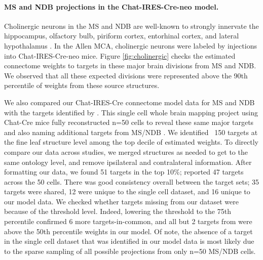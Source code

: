 \paragraph{MS and NDB projections in the Chat-IRES-Cre-neo model.}

Cholinergic neurons in the MS and NDB are well-known to strongly innervate the hippocampus, olfactory bulb, piriform cortex, entorhinal cortex, and lateral hypothalamus \citep{Zaborszky2015-fm, Watson2012TheMN}.
In the Allen MCA, cholinergic neurons were labeled by injections into Chat-IRES-Cre-neo mice.
Figure \ref{fig:cholinergic} checks the estimated connectome weights to targets in these major brain divisions from MS and NDB.
We observed that all these expected divisions were represented above the 90th percentile of weights from these source structures.

We also compared our Chat-IRES-Cre connectome model data for MS and NDB with the targets identified by  \citet{Li2018-nu}.
This single cell whole brain mapping project using Chat-Cre mice fully reconstructed n=50 cells to reveal these same major targets and also naming additional targets from MS/NDB \citep{Li2018-nu}.
We identified ~150 targets at the fine leaf structure level among the top decile of estimated weights.
To directly compare our data across studies, we merged structures as needed to get to the same ontology level, and remove ipsilateral and contralateral information.
After formatting our data, we found 51 targets in the top 10\%; \citet{Li2018-nu} reported 47 targets across the 50 cells.
There was good consistency overall between the target sets; 35 targets were shared, 12 were unique to the single cell dataset, and 16 unique to our model data.
We checked whether targets missing from our dataset were because of the threshold level.
Indeed, lowering the threshold to the 75th percentile confirmed 6 more targets-in-common, and all but 2 targets from \citet{ Li2018-nu} were above the 50th percentile weights in our model.
Of note, the absence of a target in the single cell dataset that was identified in our model data is most likely due to the sparse sampling of all possible projections from only n=50 MS/NDB cells.


